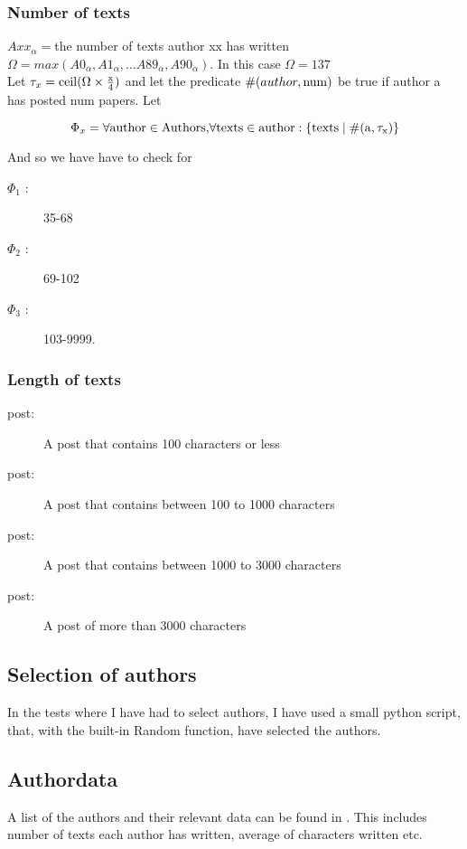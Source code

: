 \subsubsection*{Number of texts}
$Axx_{\alpha} = $the number of texts author xx has written\\ 
$\Omega = max(A0_\alpha, A1_\alpha, \ldots A89_\alpha, A90_\alpha)$. In this case $\Omega = 137$\\

Let $\tau_x = \rm{ceil}(\Omega \times \frac{x}{4})$ and let the predicate $\#(author, \rm{num})$ be true if author a has posted num papers. Let 

$$\Phi_x = \forall\rm{ author }\in\rm{ Authors, }\forall\rm{ texts }\in\rm{ author }: \{\rm{texts }\mid \#(a, \tau_x)\}$$ 
 
And so we have have to check for 
\begin{description}
\item[$\Phi_1$ :] 35-68
\item[$\Phi_2$ :] 69-102
\item[$\Phi_3$ :] 103-9999.
\end{description}

\subsubsection*{Length of texts}

\begin{description}
\item[ post:] A post that contains 100 characters or less
\item[ post:] A post that contains between 100 to 1000 characters
\item[ post:] A post that contains between 1000 to 3000 characters
\item[ post:] A post of more than 3000 characters
\end{description}

\subsection{Selection of authors}
In the tests where I have had to select authors, I have used a small python script, that, with the built-in Random function, have selected the authors.

\subsection{Authordata}
A list of the authors and their relevant data can be found in . This includes number of texts each author has written, average of characters written etc.

